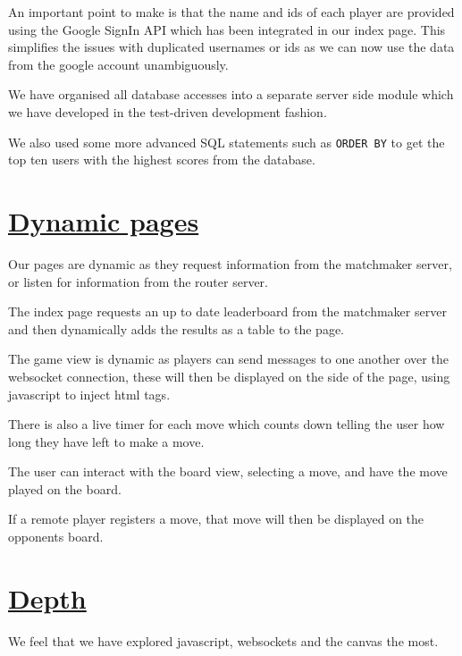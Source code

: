 \documentclass{article}
\begin{document}
    \indent An important point to make is that the name and ids of each player are provided using the Google SignIn API which has been integrated in our
    index page. This simplifies the issues with duplicated usernames or ids as we can now use the data from the google account unambiguously.

    \indent We have organised all database accesses into a separate server side module which we have developed in the test-driven
    development fashion.

    \indent We also used some more advanced SQL statements such as \verb|ORDER BY| to get the top ten users with the highest scores from the database.
\section{\underline{Dynamic pages}}\label{sec:DynamicPages}
    Our pages are dynamic as they request information from the matchmaker server, or listen for information from the router server.

    \indent The index page requests an up to date leaderboard from the matchmaker server and then dynamically adds the results as a table to the page.

    \indent The game view is dynamic as players can send messages to one another over the websocket connection, these will then be displayed on the side of the page,
    using javascript to inject html tags.

    \indent There is also a live timer for each move which counts down telling the user how long they have left to make a move.

    \indent The user can interact with the board view, selecting a move, and have the move played on the board.

    \indent If a remote player registers a move, that move will then be displayed on the opponents board.
\section{\underline{Depth}}\label{sec:Depth}
    We feel that we have explored javascript, websockets and the canvas the most.
\end{document}
